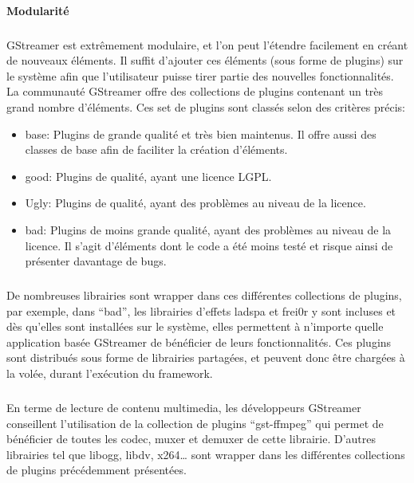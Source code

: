 \paragraph {Modularité}

\subparagraph{}

GStreamer est extrêmement modulaire, et l'on peut l'étendre facilement
en créant de nouveaux éléments. Il suffit d'ajouter ces éléments
(sous forme de plugins) sur le système afin que l'utilisateur puisse
tirer partie des nouvelles fonctionnalités. La communauté GStreamer
offre des collections de plugins contenant un très grand nombre
d'éléments. Ces set de plugins sont classés selon des critères
précis:

\begin{itemize}

  \item {base: Plugins de grande qualité et très bien maintenus. Il
  offre aussi des classes de base afin de faciliter la création
  d'éléments.}

  \item {good: Plugins de qualité, ayant une licence LGPL}.

  \item {Ugly: Plugins de qualité, ayant des problèmes au niveau de
  la licence.}

  \item {bad: Plugins de moins grande qualité, ayant des problèmes
  au niveau
    de la licence. Il s'agit d'éléments dont le code a été moins
    testé et risque ainsi de présenter davantage de bugs.}

\end{itemize}

\subparagraph{}

De nombreuses librairies sont wrapper dans ces différentes collections
de plugins, par exemple, dans ``bad'', les librairies d'effets ladspa et
frei0r y sont incluses et dès qu'elles sont installées sur le système,
elles permettent à n'importe quelle application basée GStreamer de
bénéficier de leurs fonctionnalités.  Ces plugins sont distribués
sous forme de librairies partagées, et peuvent donc être chargées à
la volée, durant l'exécution du framework.

\subparagraph{}

En terme de lecture de contenu multimedia, les développeurs GStreamer
conseillent l'utilisation de la collection de plugins ``gst-ffmpeg''
qui permet de bénéficier de toutes les codec, muxer et demuxer de
cette librairie. D'autres librairies tel que libogg, libdv, x264\ldots
sont wrapper dans les différentes collections de plugins précédemment
présentées.

